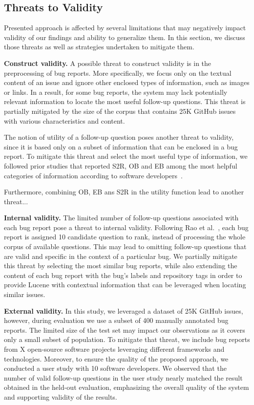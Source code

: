 \subsection{Threats to Validity}
Presented approach is affected by several limitations that may negatively impact validity of our findings and ability to generalize them. In this section, we discuss those threats as well as strategies undertaken to mitigate them.

\noindent\textbf{Construct validity.}
A possible threat to construct validity is in the preprocessing of bug reports. More specifically, we focus only on the textual content of an issue and ignore other enclosed types of information, such as images or links. In a result, for some bug reports, the system may lack potentially relevant information to locate the most useful follow-up questions.
This threat is partially mitigated by the size of the corpus that contains 25K GitHub issues with various characteristics and content.

The notion of utility of a follow-up question poses another threat to validity, since it is based only on a subset of information that can be enclosed in a bug report. To mitigate this threat and select the most useful type of information, we followed prior studies that reported S2R, OB and EB among the most helpful categories of information according to software developers~\cite{Zimmermann2010}.

Furthermore,  combining OB, EB ans S2R in the utility function lead to another threat...


\noindent\textbf{Internal validity.}
The limited number of follow-up questions associated with each bug report pose a threat to internal validity. Following Rao et al.~\cite{rao-daume-iii-2018-learning}, each bug report is assigned 10 candidate question to rank, instead of processing the whole corpus of available questions. This  may lead to omitting follow-up questions that are valid and specific in the context of a particular bug. We partially mitigate this threat by selecting the most similar bug reports, while also extending the content of each bug report with the bug's labels and repository tags in order to provide Lucene with contextual information that can be leveraged when locating similar issues.


\noindent\textbf{External validity.}
In this study, we leveraged a dataset of 25K GitHub issues, however, during evaluation we use a subset of 400 manually annotated bug reports. The limited size of the test set may impact our observations as it covers only a small subset of population. To mitigate that threat, we include bug reports from X open-source software projects leveraging different frameworks and technologies. Moreover, to ensure the quality of the proposed approach, we conducted a user study with 10 software developers. We observed that the number of valid follow-up questions in the user study nearly matched the result obtained in the held-out evaluation, emphasizing the overall quality of the system and supporting validity of the results.

